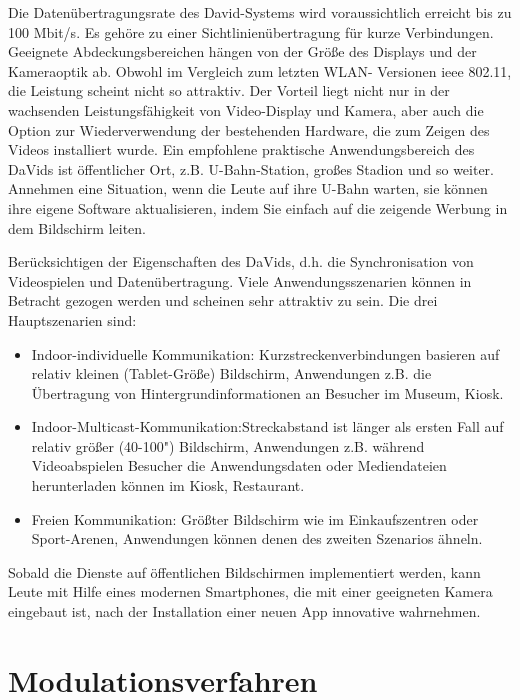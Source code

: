 Die Datenübertragungsrate des David-Systems wird voraussichtlich erreicht bis zu 100 Mbit/s. Es gehöre	zu einer Sichtlinienübertragung für kurze Verbindungen. Geeignete Abdeckungsbereichen hängen von der Größe des Displays und der Kameraoptik ab. Obwohl im Vergleich zum letzten WLAN- Versionen \gls{ieee} 802.11, die Leistung scheint nicht so attraktiv. Der Vorteil liegt nicht nur in der wachsenden Leistungsfähigkeit von Video-Display und Kamera, aber auch die Option zur Wiederverwendung der bestehenden Hardware, die zum Zeigen des Videos installiert wurde. Ein empfohlene praktische Anwendungsbereich des DaVids ist öffentlicher Ort, z.B. U-Bahn-Station, großes Stadion und so weiter. Annehmen eine Situation, wenn die Leute auf ihre U-Bahn warten, sie können ihre eigene Software aktualisieren, indem Sie einfach auf die zeigende Werbung in dem Bildschirm leiten.

Berücksichtigen der Eigenschaften des DaVids, d.h. die Synchronisation von Videospielen und Datenübertragung. Viele Anwendungsszenarien können in Betracht gezogen werden und scheinen sehr attraktiv zu sein. Die drei Hauptszenarien sind:

\begin{itemize}
  \item Indoor-individuelle Kommunikation: Kurzstreckenverbindungen basieren auf relativ kleinen (Tablet-Größe) Bildschirm, Anwendungen z.B. die Übertragung von Hintergrundinformationen an Besucher im Museum, Kiosk.
  \item Indoor-Multicast-Kommunikation:Streckabstand ist länger als ersten Fall auf relativ größer (40-100") Bildschirm, Anwendungen z.B. während Videoabspielen Besucher die Anwendungsdaten oder Mediendateien herunterladen können im Kiosk, Restaurant.
  \item Freien Kommunikation: Größter Bildschirm wie im Einkaufszentren oder Sport-Arenen, Anwendungen können denen des zweiten Szenarios ähneln.
\end{itemize}

Sobald die Dienste auf öffentlichen Bildschirmen implementiert werden, kann Leute mit Hilfe eines modernen Smartphones, die mit einer geeigneten Kamera eingebaut ist, nach der Installation einer neuen App innovative wahrnehmen.



\section{Modulationsverfahren} 

